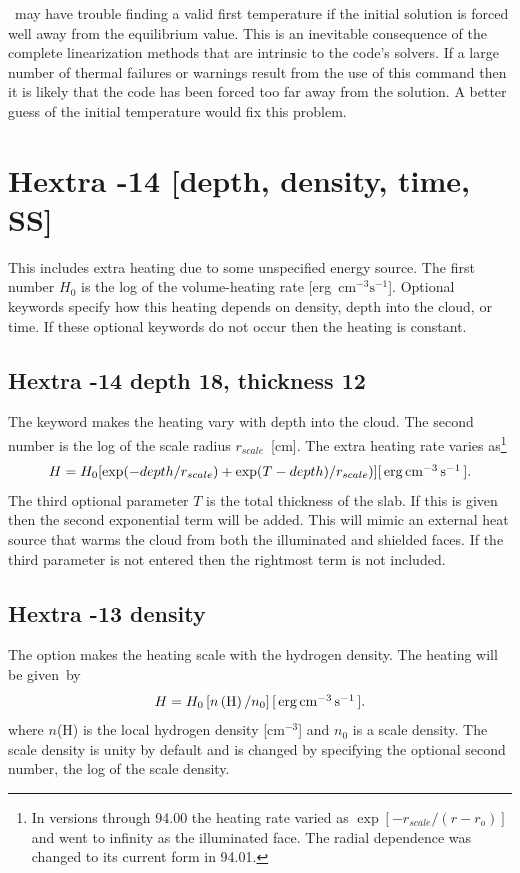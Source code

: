 \Cloudy\ may have trouble finding a valid first temperature if the initial
solution is forced well away from the equilibrium value.
This is an
inevitable consequence of the complete linearization methods that are
intrinsic to the code's solvers.
If a large number of thermal failures
or warnings result from the use of this command then it is likely that the
code has been forced too far away from the solution.
A better guess of
the initial temperature would fix this problem.

\section{Hextra -14 [depth, density, time, SS]}

This includes extra heating due to some unspecified energy source.
The
first number $H_0$ is the log of the volume-heating rate
[erg~cm$^{-3}\mathrm{s}^{-1}$].
Optional keywords specify how this heating depends on density,
depth into the cloud, or time.
If these optional keywords do not occur then the heating
is constant.

\subsection{Hextra -14 depth 18, thickness 12}

The keyword  makes the heating vary with depth
into the cloud.
The
second number is the log of the scale radius $r_{scale}$~[cm].
The extra heating
rate varies as\footnote{In versions through 94.00 the heating rate
varied as
$\exp[-r_{scale}/(r-r_o)]$ and went to infinity as the illuminated face.  The radial
dependence was changed to its current form in 94.01.}
\begin{equation}
H = H_0 [\exp ( - depth/r_{scale} ) + \exp (T - depth)/r_{scale} )]
 [\ergpccmps ].%
\end{equation}
The third optional parameter $T$ is the total thickness of the slab.
If this
is given then the second exponential term will be added.
This will mimic
an external heat source that warms the cloud from both the illuminated and
shielded faces.
If the third parameter is not entered then the rightmost
term is not included.

\subsection{Hextra -13 density }

The  option makes the heating scale with the
hydrogen density.
The heating will be given~by
\begin{equation}
H = H_0 \left[ {n\left( \mathrm{H} \right)/n_0 } \right]
[\mbox{${\rm\thinspace erg}{\rm\thinspace cm}^{-3}{\rm\thinspace s}^{-1}\,$} ].
\end{equation}
where $n$(H) is the local hydrogen density [cm$^{-3}$]
and $n_0$ is a scale density.
The scale density is unity by default and is changed by specifying the
optional second number, the log of the scale density.

